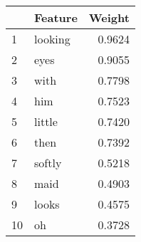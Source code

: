 \begin{tabular}{llr}
\toprule
{} &  Feature &  Weight \\
\midrule
1  &  looking &  0.9624 \\
2  &     eyes &  0.9055 \\
3  &     with &  0.7798 \\
4  &      him &  0.7523 \\
5  &   little &  0.7420 \\
6  &     then &  0.7392 \\
7  &   softly &  0.5218 \\
8  &     maid &  0.4903 \\
9  &    looks &  0.4575 \\
10 &       oh &  0.3728 \\
\bottomrule
\end{tabular}
